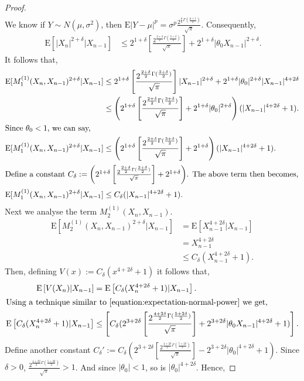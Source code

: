 \documentclass[11pt]{amsart}
\newcommand{\E}{\mathrm{E}}
\begin{document}
\begin{proof}
\begin{align*}
\end{align*}
We know if $Y\sim N(\mu,\sigma^2)$, then $
\E|Y-\mu|^p  =\sigma^p\frac{2^{\frac{p}{2} \Gamma(\frac{p+1}{2})}}{\sqrt{\pi}}$. Consequently,
%
\begin{align}~\label{equation:expectation-normal-power}
    \E[|X_n|^{2+\delta}|X_{n-1}] & \leq 2^{1+\delta}\left[\frac{2^{\frac{2+\delta}{2} \Gamma(\frac{3+\delta}{2})}}{\sqrt{\pi}}\right]+2^{1+\delta}|\theta_0X_{n-1}|^{2+\delta}.
\end{align}
%
It follows that,
%
\begin{align*}
    \E[M^{(1)}_1(X_n,X_{n-1})^{2+\delta}|X_{n-1}] & \leq  2^{1+\delta}\left[\frac{2^{\frac{2+\delta}{2} \Gamma(\frac{3+\delta}{2})}}{\sqrt{\pi}}\right]|X_{n-1}|^{2+\delta}+2^{1+\delta}|\theta_0|^{2+\delta}|X_{n-1}|^{4+2\delta}\\
    & \leq \left(2^{1+\delta}\left[\frac{2^{\frac{2+\delta}{2} \Gamma(\frac{3+\delta}{2})}}{\sqrt{\pi}}\right]+2^{1+\delta}|\theta_0|^{2+\delta}\right)(|X_{n-1}|^{4+2\delta}+1).\\
\intertext{Since $\theta_0<1$, we can say,}
    \E[M^{(1)}_1(X_n,X_{n-1})^{2+\delta}|X_{n-1}] & \leq \left(2^{1+\delta}\left[\frac{2^{\frac{2+\delta}{2} \Gamma(\frac{3+\delta}{2})}}{\sqrt{\pi}}\right]+2^{1+\delta}\right)(|X_{n-1}|^{4+2\delta}+1).\\
\intertext{Define a constant $C_{\delta}:= \left(2^{1+\delta}\left[\frac{2^{\frac{2+\delta}{2} \Gamma(\frac{3+\delta}{2})}}{\sqrt{\pi}}\right]+2^{1+\delta}\right)$. The above term then becomes,}
   \E[M^{(1)}_1(X_n,X_{n-1})^{2+\delta}|X_{n-1}] & \leq  C_{\delta}(|X_{n-1}|^{4+2\delta}+1).\\
\end{align*}
%
Next we analyse the term $M^{(1)}_2(X_n,X_{n-1})$.
%
\begin{align*}
    \E\left[ M^{(1)}_2(X_n,X_{n-1})^{2+\delta} |X_{n-1}\right] & = \E[X_{n-1}^{4+2\delta}|X_{n-1}]\\
    & = X_{n-1}^{4+2\delta}\\
    & \leq C_{\delta}(X_{n-1}^{4+2\delta}+1).
\end{align*}
%
Then, defining $V(x):=C_{\delta}(x^{4+2\delta}+1)$ it follows that,
%
\begin{align*}
    \E \left[V(X_n) | X_{n-1}\right] & = \E \left[C_{\delta}(X_{n}^{4+2\delta}+1) | X_{n-1}\right]. \\
\intertext{Using a technique similar to \Cref{equation:expectation-normal-power} we get,}
     \E \left[C_{\delta}(X_{n}^{4+2\delta}+1) | X_{n-1}\right] & \leq \left[C_{\delta}( 2^{3+2\delta}\left[\frac{2^{\frac{4+2\delta}{2} \Gamma(\frac{5+2\delta}{2})}}{\sqrt{\pi}}\right]+2^{3+2\delta}|\theta_0X_{n-1}|^{4+2\delta}+1) \right].\\
\end{align*}
Define another constant $C_{\delta}':= C_{\delta}\left(2^{3+2\delta}\left[\frac{2^{\frac{4+2\delta}{2} \Gamma(\frac{5+2\delta}{2})}}{\sqrt{\pi}}\right]-2^{3+2\delta}|\theta_0|^{4+2\delta}+1\right)$. Since $\delta>0$, $\frac{2^{\frac{4+2\delta}{2} \Gamma(\frac{5+2\delta}{2})}}{\sqrt{\pi}}>1$. And since $|\theta_0|<1$, so is $|\theta_0|^{4+2\delta}$. Hence,


\end{proof}
\end{document}
